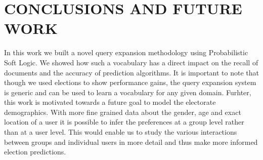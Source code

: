 \section{CONCLUSIONS AND FUTURE WORK}
In this work we built a novel query expansion methodology using Probabilistic Soft Logic.
We showed how such a vocabulary has a direct impact on the recall of documents and the accuracy of prediction algorithms.
It is important to note that though we used elections to show performance gains, the query expansion system is generic and can be used to learn a vocabulary for any given domain.
Furhter, this work is motivated towards a future goal to model the electorate demographics.
With more fine grained data about the gender, age and exact location of a user it is possible to infer the preferences at a group level rather than at a user level.
This would enable us to study the various interactions between groups and individual users in more detail and thus make more informed election predictions.